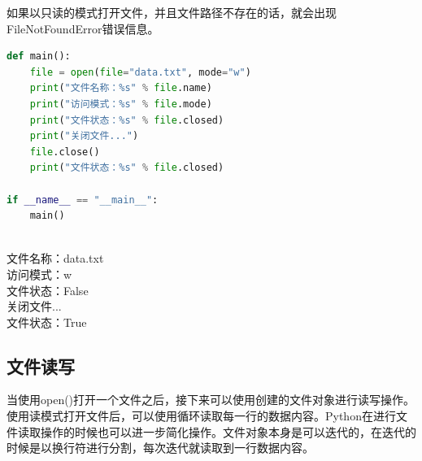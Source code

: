 如果以只读的模式打开文件，并且文件路径不存在的话，就会出现FileNotFoundError错误信息。 \\

\begin{lstlisting}[language=Python]
def main():
    file = open(file="data.txt", mode="w")
    print("文件名称：%s" % file.name)
    print("访问模式：%s" % file.mode)
    print("文件状态：%s" % file.closed)
    print("关闭文件...")
    file.close()
    print("文件状态：%s" % file.closed)

if __name__ == "__main__":
    main()
\end{lstlisting}

\begin{tcolorbox}
	 \\
	文件名称：data.txt \\
	访问模式：w \\
	文件状态：False \\
	关闭文件... \\
	文件状态：True
\end{tcolorbox}

\subsection{文件读写}

当使用open()打开一个文件之后，接下来可以使用创建的文件对象进行读写操作。 \\

使用读模式打开文件后，可以使用循环读取每一行的数据内容。Python在进行文件读取操作的时候也可以进一步简化操作。文件对象本身是可以迭代的，在迭代的时候是以换行符进行分割，每次迭代就读取到一行数据内容。

